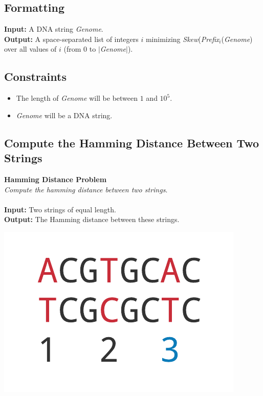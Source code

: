\documentclass{article}
\begin{document}
\subsection*{Formatting}
\textbf{Input:} A DNA string \emph{Genome}.\\
\noindent \textbf{Output:} A space-separated list of integers $i$ minimizing \emph{Skew}(\emph{Prefix}$_i$(\emph{Genome}) over all values of $i$ (from 0 to $|$\emph{Genome}$|$).

\subsection*{Constraints}
\begin{itemize}
    \item The length of \emph{Genome} will be between $1$ and $10^5$.
    \item \emph{Genome} will be a DNA string.
\end{itemize}
\pagebreak
\subsection{Compute the Hamming Distance Between Two Strings}
\hline\vspace{5}
\noindent \textbf{Hamming Distance Problem}\\
\emph{Compute the hamming distance between two strings}.\\ \\
\textbf{Input:} Two strings of equal length.\\
\textbf{Output:} The Hamming distance between these strings.
\begin{center}
    \includegraphics[scale=0.24]{c1/logos/1G.png} 
\end{center}
\hline\vspace{5}
\end{document}
